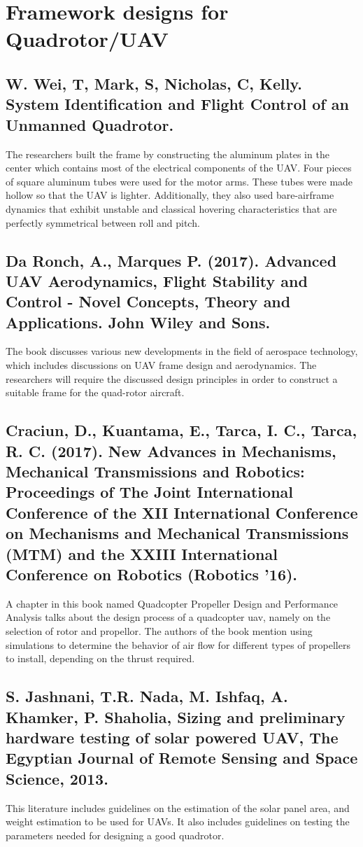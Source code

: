 \section{Framework designs for Quadrotor/UAV}

\subsection{W. Wei, T, Mark, S, Nicholas, C, Kelly. System Identification and Flight Control of an Unmanned Quadrotor.}

The researchers built the frame by constructing the aluminum plates in the center which contains most of the electrical components of the UAV. Four pieces of square aluminum tubes were used for the motor arms. These tubes were made hollow so that the UAV is lighter. Additionally, they also used bare-airframe dynamics that exhibit unstable and classical hovering characteristics that are perfectly symmetrical between roll and pitch.

\subsection{Da Ronch,  A., Marques P. (2017). Advanced UAV Aerodynamics, Flight Stability and Control - Novel Concepts, Theory and Applications. John Wiley and Sons.}
The book discusses various new developments in the field of aerospace technology, which includes discussions on UAV frame design and aerodynamics. The researchers will require the discussed design principles in order to construct a suitable frame for the quad-rotor aircraft.

\subsection{Craciun, D., Kuantama, E., Tarca, I. C., Tarca, R. C. (2017). New Advances in Mechanisms, Mechanical Transmissions and Robotics: Proceedings of The Joint International Conference of the XII International Conference on Mechanisms and Mechanical Transmissions (MTM) and the XXIII International Conference on Robotics (Robotics ’16).}
 A chapter in this book named Quadcopter Propeller Design and Performance Analysis talks about the design process of a quadcopter uav, namely on the selection of rotor and propellor. The authors of the book mention using simulations to determine the behavior of air flow for different types of propellers to install, depending on the thrust required.

\subsection{S. Jashnani, T.R. Nada, M. Ishfaq, A. Khamker, P. Shaholia, Sizing and preliminary hardware testing of solar powered UAV, The Egyptian Journal of Remote Sensing and Space Science, 2013.} This literature includes guidelines on the estimation of the solar panel area, and weight estimation to be used for UAVs. It also includes guidelines on testing the parameters needed for designing a good quadrotor.


